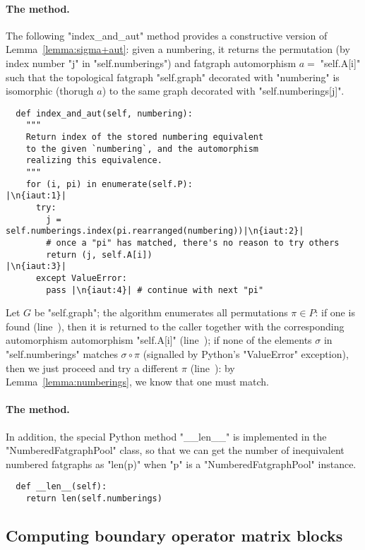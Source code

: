 \paragraph{The  method.}
The following "index_and_aut" method provides a constructive version
of Lemma~\ref{lemma:sigma+aut}: given a numbering, it returns the
permutation (by index number "j" in "self.numberings") and fatgraph
automorphism $a=\;$"self.A[i]" such that the topological fatgraph
"self.graph" decorated with "numbering" is isomorphic (thorugh $a$) to
the same graph decorated with "self.numberings[j]".
\begin{lstlisting}
  def index_and_aut(self, numbering):
    """
    Return index of the stored numbering equivalent 
    to the given `numbering`, and the automorphism
    realizing this equivalence.
    """
    for (i, pi) in enumerate(self.P):                      |\n{iaut:1}|
      try:
        j = self.numberings.index(pi.rearranged(numbering))|\n{iaut:2}|
        # once a "pi" has matched, there's no reason to try others
        return (j, self.A[i])                              |\n{iaut:3}|
      except ValueError:
        pass |\n{iaut:4}| # continue with next "pi"
\end{lstlisting}
Let $G$ be "self.graph"; the algorithm enumerates all permutations
$\pi \in P$: if one is found (line~), then it is returned
to the caller together with the corresponding automorphism
automorphism "self.A[i]" (line~); if none of the elements
$\sigma$ in "self.numberings" matches $\sigma \circ \pi$ (signalled by
Python's "ValueError" exception), then we just proceed and try a
different $\pi$ (line~): by Lemma~\ref{lemma:numberings},
we know that one must match.

\paragraph{The  method.}
In addition, the special Python method "__len__" is implemented in the
"NumberedFatgraphPool" class, so that we can get the number of
inequivalent numbered fatgraphs as "len(p)" when "p" is a
"NumberedFatgraphPool" instance.
\begin{lstlisting}
  def __len__(self):
    return len(self.numberings)

\end{lstlisting}


\subsection{Computing boundary operator matrix blocks}
\label{sec:blocks}

